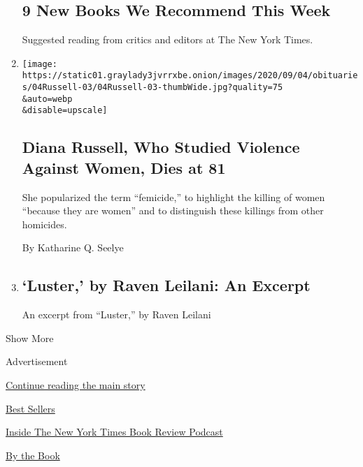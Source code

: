 \begin{enumerate}
  \hypertarget{9-new-books-we-recommend-this-week}{%
  \subsection{9 New Books We Recommend This
  Week}\label{9-new-books-we-recommend-this-week}}

  Suggested reading from critics and editors at The New York Times.
\item
  \href{/2020/08/06/obituaries/diana-russell-dead.html}{}

  \texttt{[image: https://static01.graylady3jvrrxbe.onion/images/2020/09/04/obituaries/04Russell-03/04Russell-03-thumbWide.jpg?quality=75\\\&auto=webp\\\&disable=upscale]}

  \hypertarget{diana-russell-who-studied-violence-against-women-dies-at-81}{%
  \subsection{Diana Russell, Who Studied Violence Against Women, Dies at
  81}\label{diana-russell-who-studied-violence-against-women-dies-at-81}}

  She popularized the term ``femicide,'' to highlight the killing of
  women ``because they are women'' and to distinguish these killings
  from other homicides.

  By Katharine Q. Seelye
\item
  \href{/2020/08/06/books/review/luster-by-raven-leilani-an-excerpt.html}{}

  \hypertarget{luster-by-raven-leilani-an-excerpt}{%
  \subsection{`Luster,' by Raven Leilani: An
  Excerpt}\label{luster-by-raven-leilani-an-excerpt}}

  An excerpt from ``Luster,'' by Raven Leilani
\end{enumerate}

Show More

Advertisement

\protect\hyperlink{after-mid2}{Continue reading the main story}

\href{https://www.nytimes3xbfgragh.onion/best-sellers-books/overview.html}{Best
Sellers}

\href{https://www.nytimes3xbfgragh.onion/column/book-review-podcast}{Inside
The New York Times Book Review Podcast}

\href{https://www.nytimes3xbfgragh.onion/column/by-the-book}{By the
Book}

